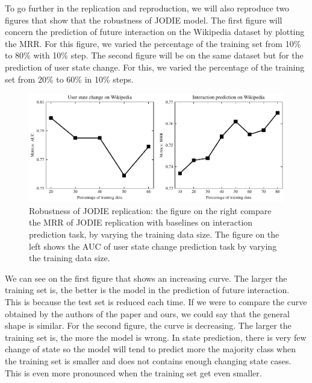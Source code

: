 To go further in the replication and reproduction, we will also reproduce two figures that show that the robustness of JODIE model. The first figure will concern the prediction of future interaction on the Wikipedia dataset by plotting the MRR. For this figure, we varied the percentage of the training set from 10\% to 80\% with 10\% step. The second figure will be on the same dataset but for the prediction of user state change. For this, we varied the percentage of the training set from 20\% to 60\% in 10\% steps.

\begin{figure}[H]
    \centering
    \includegraphics[width = \textwidth]{image/percentage_train.pdf}
    \caption{Robustness of JODIE replication: the figure on the right compare the MRR of JODIE replication with baselines on interaction prediction task, by varying the training data size. The figure on the left shows the AUC of user state change prediction task by varying the training data size.}
    \label{fig:my_label}
\end{figure}

We can see on the first figure that shows an increasing curve. The larger the training set is, the better is the model in the prediction of future interaction. This is because the test set is reduced each time. If we were to compare the curve obtained by the authors of the paper and ours, we could say that the general shape is similar.
For the second figure, the curve is decreasing. The larger the training set is, the more the model is wrong. In state prediction, there is very few change of state so the model will tend to predict more the majority class when the training set is smaller and does not contains enough changing state cases. This is even more pronounced when the training set get even smaller.

